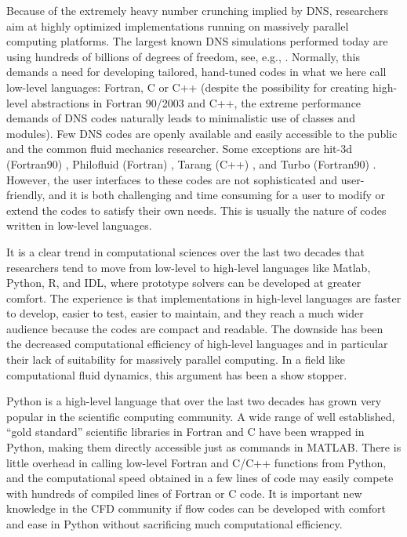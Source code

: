 \documentclass[final,3p,times,twocolumn]{elsarticle}
\begin{document}
Because of the extremely heavy number crunching implied by DNS,
researchers aim at highly optimized implementations running on
massively parallel computing platforms. The largest known DNS
simulations performed today are using hundreds of billions of degrees
of freedom, see, e.g., \cite{Lee2013, deBruynKops15}. Normally, this demands a 
need for developing tailored, hand-tuned
codes in what we here call low-level languages: Fortran, C or C++ (despite
the possibility for creating high-level abstractions in Fortran 90/2003 and
C++, the extreme performance demands of DNS codes naturally leads to
minimalistic use of classes and modules). Few DNS codes are openly available 
and easily accessible to the public and the common fluid mechanics researcher. 
Some exceptions are hit-3d (Fortran90) \cite{hit-3d}, Philofluid (Fortran) 
\cite{philofluid}, Tarang (C++) \cite{tarang}, and Turbo (Fortran90)
\cite{turbo}. However, the user interfaces to these codes are not sophisticated 
and user-friendly, and it is both challenging and time consuming for a user to
modify or extend the codes to satisfy their own needs. This is usually
the nature of codes written in low-level languages.

It is a clear trend in computational sciences over the last two decades
that researchers tend to move from low-level to high-level languages
like Matlab, Python, R, and IDL, where prototype solvers can be developed at 
greater comfort. The experience is that implementations
in high-level languages are faster to develop, easier to test,
easier to maintain, and they reach a much wider audience because the codes are 
compact and readable. The downside has been the decreased computational
efficiency of high-level languages and in particular their lack of
suitability for massively parallel computing. In a field like computational
fluid dynamics, this argument has been a show stopper. 


Python is a high-level language that over the last two decades has grown very 
popular in the scientific computing community. A wide range of well 
established, ``gold standard'' scientific libraries in Fortran and C have been 
wrapped in Python, making them directly accessible just as commands in MATLAB. 
There is little overhead in calling low-level Fortran and C/C++ functions from 
Python, and the computational speed obtained in a few lines of code may easily 
compete with hundreds of compiled lines of Fortran or C code. It is important 
new knowledge in the CFD community if flow codes can be developed with comfort 
and ease in Python without sacrificing much computational efficiency.
\end{document}
